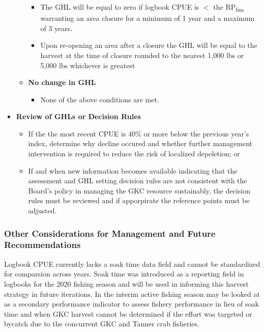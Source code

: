 \documentclass[]{article}
\providecommand{\tightlist}{%
  \setlength{\itemsep}{0pt}\setlength{\parskip}{0pt}}
\begin{document}
\begin{itemize}
\begin{itemize}
    \begin{itemize}
    \tightlist
    \item
      The GHL will be equal to zero if logbook CPUE is \(<\) the
      RP\textsubscript{lim} warranting an area closure for a minimum of
      1 year and a maximum of 3 years.
    \item
      Upon re-opening an area after a closure the GHL will be equal to
      the harvest at the time of closure rounded to the nearest 1,000
      lbs or 5,000 lbs whichever is greatest
    \end{itemize}
  \item
    \textbf{No change in GHL}

    \begin{itemize}
    \tightlist
    \item
      None of the above conditions are met.
    \end{itemize}
  \end{itemize}
\item
  \textbf{Review of GHLs or Decision Rules}

  \begin{itemize}
  \tightlist
  \item
    If the the most recent CPUE is 40\% or more below the previous
    year's index, determine why decline occured and whether further
    management intervention is required to reduce the risk of localized
    depeletion; or
  \item
    If and when new information becomes available indicating that the
    assessment and GHL setting decision rules are not consistent with
    the Board's policy in managing the GKC resource sustainably, the
    decision rules must be reviewed and if apporpirate the reference
    points must be adjusted.
  \end{itemize}
\end{itemize}

\subsubsection*{Other Considerations for Management and Future
Recommendations}\label{other-considerations-for-management-and-future-recommendations}

Logbook CPUE currently lacks a soak time data field and cannot be
standardized for comparsion across years. Soak time was introduced as a
reporting field in logbooks for the 2020 fishing season and will be used
in informing this harvest strategy in future iterations. In the interim
active fishing season may be looked at as a secondary performance
indicator to assess fishery performance in lieu of soak time and when
GKC harvest cannot be determined if the effort was targeted or bycatch
due to the concurrent GKC and Tanner crab fisheries.
\end{document}
